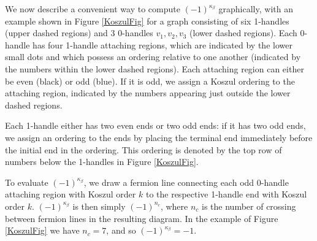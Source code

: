 \medskip


We now describe a convenient way to compute $(-1)^{\kappa_\beta}$ graphically, with an 
example shown in Figure \ref{KoszulFig} for a graph consisting of six 1-handles (upper dashed regions) and 3 0-handles $v_1,v_2,v_3$ (lower dashed regions). 
Each 0-handle has four 1-handle attaching regions, which are indicated by the lower small dots and 
which possess an ordering relative to one another (indicated by the numbers within the lower dashed regions). Each attaching 
region can either be even (black) or odd (blue). If it is odd, 
we assign a Koszul ordering to the attaching
region, indicated by the numbers appearing just outside the lower dashed regions.

Each 1-handle either has two even ends or two odd ends: if it has two odd ends, we assign an ordering 
to the ends by placing the terminal end immediately before the initial end in the ordering. This ordering
is denoted by the top row of numbers below the 1-handles in Figure \ref{KoszulFig}. 

To evaluate $(-1)^{\kappa_\beta}$, we draw a fermion line connecting each odd 0-handle attaching region
with Koszul order $k$ to the respective 1-handle end with Koszul order $k$. $(-1)^{\kappa_\beta}$ is then 
simply $(-1)^{n_c}$, where $n_c$ is the number of crossing between fermion lines in the resulting diagram. 
In the example of Figure \ref{KoszulFig} we have $n_c=7$, and so $(-1)^{\kappa_\beta}=-1$. 

\medskip







